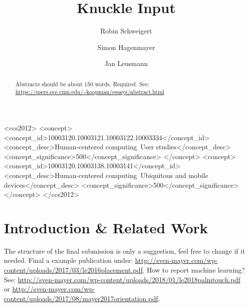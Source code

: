 \documentclass[sigchi-a, authorversion]{acmart}
\begin{document}
\title{Knuckle Input}

\author{Robin Schweigert}

\author{Simon Hagenmayer}

\author{Jan Leusmann}


\renewcommand{\shortauthors}{F. Author et al.}


%
%


\begin{CCSXML}
<ccs2012>
 <concept>
<concept_id>10003120.10003121.10003122.10003334</concept_id>
<concept_desc>Human-centered computing~User studies</concept_desc>
<concept_significance>500</concept_significance>
</concept>
<concept>
<concept_id>10003120.10003138.10003141</concept_id>
<concept_desc>Human-centered computing~Ubiquitous and mobile devices</concept_desc>
<concept_significance>500</concept_significance>
</concept>
</ccs2012>
\end{CCSXML}



\begin{abstract}
Abstracts should be about 150 words. Required. See: \url{https://users.ece.cmu.edu/~koopman/essays/abstract.html}
\end{abstract}



\maketitle

\section{Introduction \& Related Work}
The structure of the final submission is only a suggestion, feel free to change if it needed. Final a example publication under: \url{http://sven-mayer.com/wp-content/uploads/2017/03/le2016placement.pdf}. How to report machine learning? See: \url{http://sven-mayer.com/wp-content/uploads/2018/01/le2018palmtouch.pdf} or \url{http://sven-mayer.com/wp-content/uploads/2017/08/mayer2017orientation.pdf}.
\end{document}
